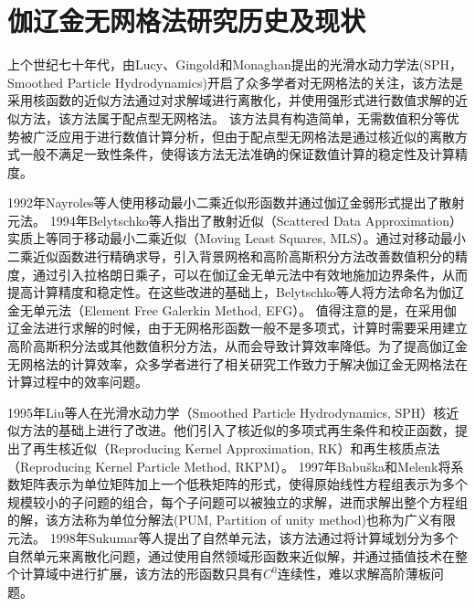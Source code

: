 \section{伽辽金无网格法研究历史及现状}
上个世纪七十年代，由Lucy\textsuperscript{\cite{1977A}}、Gingold和Monaghan\textsuperscript{\cite{gingold1977}}提出的光滑水动力学法(SPH，Smoothed Particle Hydrodynamics)开启了众多学者对无网格法的关注，该方法是采用核函数的近似方法通过对求解域进行离散化，并使用强形式进行数值求解的近似方法，该方法属于配点型无网格法。
该方法具有构造简单，无需数值积分等优势被广泛应用于进行数值计算分析，但由于配点型无网格法是通过核近似的离散方式一般不满足一致性条件，使得该方法无法准确的保证数值计算的稳定性及计算精度\textsuperscript{\cite{auricchio2010a,wang2018a,wang2020,gomez2016}}。
\par
1992年Nayroles等人\textsuperscript{\cite{nayroles1992}}使用移动最小二乘近似形函数并通过伽辽金弱形式提出了散射元法。
1994年Belytschko等人\textsuperscript{\cite{belytschko1994}}指出了散射近似（Scattered Data Approximation）实质上等同于移动最小二乘近似（Moving Least Squares, MLS）。通过对移动最小二乘近似函数进行精确求导，引入背景网格和高阶高斯积分方法改善数值积分的精度，通过引入拉格朗日乘子，可以在伽辽金无单元法中有效地施加边界条件，从而提高计算精度和稳定性。在这些改进的基础上，Belytschko等人将方法命名为伽辽金无单元法（Element Free Galerkin Method, EFG）。
值得注意的是，在采用伽辽金法进行求解的时候，由于无网格形函数一般不是多项式，计算时需要采用建立高阶高斯积分法或其他数值积分方法\textsuperscript{\cite{de2001,carpinteri2002,WangBingBing2019}}，从而会导致计算效率降低\textsuperscript{\cite{melenk1996,WuJunChao}}。为了提高伽辽金无网格法的计算效率，众多学者进行了相关研究工作致力于解决伽辽金无网格法在计算过程中的效率问题\textsuperscript{\cite{wang2016,wang2019,chen2001,chen2013,duan2012,duan2014}}。
\par
1995年Liu等人\textsuperscript{\cite{liu1995}}在光滑水动力学（Smoothed Particle Hydrodynamics, SPH）核近似方法的基础上进行了改进。他们引入了核近似的多项式再生条件和校正函数，提出了再生核近似（Reproducing Kernel Approximation, RK）和再生核质点法（Reproducing Kernel Particle Method, RKPM）。
1997年Babuška和Melenk\textsuperscript{\cite{melenk1996,babuska1997}}将系数矩阵表示为单位矩阵加上一个低秩矩阵的形式，使得原始线性方程组表示为多个规模较小的子问题的组合，每个子问题可以被独立的求解，进而求解出整个方程组的解，该方法称为单位分解法(PUM, Partition of unity method)也称为广义有限元法\textsuperscript{\cite{strouboulis2001}}。
1998年Sukumar等人\textsuperscript{\cite{sukumar1998}}提出了自然单元法，该方法通过将计算域划分为多个自然单元来离散化问题，通过使用自然领域形函数来近似解，并通过插值技术在整个计算域中进行扩展，该方法的形函数只具有$C^0$连续性，难以求解高阶薄板问题。
